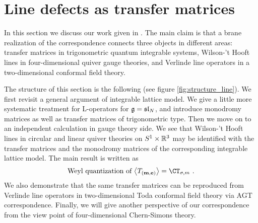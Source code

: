\begin{comment}
\documentclass[11pt]{article}  %
\usepackage{Common/toshi}

\end{comment}




\section{Line defects as transfer matrices}
\label{sec:line}


In this section we discuss our work given in \cite{Maruyoshi:2020cwy}.
The main claim is that a brane realization of the correspondence connects
three objects in different areas:
transfer matrices in trigonometric quantum integrable systems,
Wilson-'t Hooft lines in four-dimensional quiver gauge theories, and
Verlinde line operators in a two-dimensional conformal field theory.

The structure of this section is the following (see figure \ref{fig:structure_line}).
We first revisit a general argument of integrable lattice model.
We give a little more systematic treatment for L-operators for $\mathfrak{g}=\mathfrak{sl}_N$,
and introduce monodromy matrices as well as transfer matrices of trigonometric type.
Then we move on to an independent calculation in gauge theory side.
We see that Wilson-'t Hooft lines in circular and linear quiver theories on $S^1\times\mathbb{R}^3$
may be identified with the transfer matrices and the monodromy matrices
of the corresponding integrable lattice model.
The main result is written as
\begin{equation}
  \text{Weyl quantization of } \bigvev{T_{(\mcharge,\echarge)}}
    = \CT_{\sigma,m}
    ~ .
\end{equation}
We also demonstrate that the same transfer matrices can be reproduced from Verlinde line operators
in two-dimensional Toda conformal field theory via AGT correspondence.
Finally, we will give another perspective of our correspondence from the view point of
four-dimensional Chern-Simons theory.


